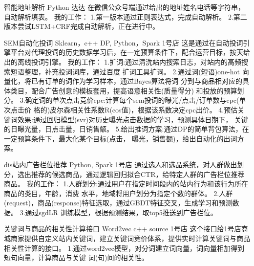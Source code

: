 \documentclass[11pt,a4paper]{moderncv}
\begin{document}
{智能地址解析}
{Python}{}
{达达}
{
在微信公众号端通过给出的地址姓名电话等字符串，自动解析填表。
\newline  我的工作：
\newline 1.第一版本通过正则表达式，完成自动解析。
\newline 2.第二版本尝试LSTM+CRF完成自动解析，正在进行中。
\newline 
}

{SEM自动化投词}
{Sklearn，c++ DP, Python，Spark}{}
{1号店}
{
这是通过在自动投词引擎平台对代理投词的历史数据学习后，在一定预算条件下，配合运营目标，按天给出的离线投词引擎。
\newline  我的工作：
\newline 1.扩词:通过清洗站内搜索日志，对站内的高频搜索短语整理，补充投词词库，通过百度 扩词工具扩词。
\newline 2.通过词(短语)one-hot 向量化，将已有订单的词作为学习样本，通过Bayes算法将词 分到与商品相对应的具体类目，配合广告创意的模板套用，提高语意相关性(质量得分) 和投放的预算划分。
\newline 3.确定词的单次点击竞价cpc:计算每个sem投词的曝光/点击/订单数与cpc(单次点击价 格的)皮尔森相关性系数R(cos值)，根据该系数决定cpc出价。
\newline 4.预估关键词效果:通过回归模型(svr)对历史曝光点击数据的学习，预测具体日期下， 关键的日曝光量，日点击量，日销售额。
\newline 5.给出推词方案:通过DP的简单背包算法，在一定预算条件下，最大化某个目标(点击， 曝光，销售额)，给出自动化的出词方案。
\newline
}

{dis站内广告栏位推荐}
{Python, Spark}{}
{1号店}
{
通过选人和选品系统，对人群做出划分，选出推荐的候选商品，通过逻辑回归拟合CTR，给特定人群的广告栏位推荐商品。
\newline  我的工作：
\newline 1.人群划分:通过用户在指定时间段内的站内行为和该行为所在商品的类目，年龄，消费 水平，地域将用户划分为指定个数的群体。
\newline 2.人群(request)，商品(response)特征选取，通过GBDT特征交叉，生成学习和预测数据。
\newline 3.通过sgdLR 训练模型，根据预测结果，取top5推送到广告栏位。
\newline
}

{关键词与商品的相关性计算接口}
{Word2vec c++ source}{}
{1号店}
{
这个接口给1号店商城商家提供自定义站内关键词，建立关键词竞价体系，提供实时计算关键词与商品相关性计算的接口。
\newline 1.通过word2vec模型，对分词建立词向量，词向量相加得到短句向量，计算商品与关键 词(句)间的相关性。
\newline
}
\end{document}
